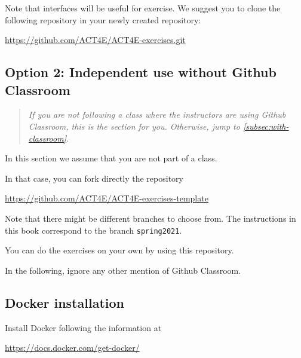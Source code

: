 Note that interfaces will be useful for exercise. We suggest you to clone the following repository in your newly created  repository:

\url{https://github.com/ACT4E/ACT4E-exercises.git}

\subsection{Option 2: Independent use without Github Classroom}
\label{sub:without-classroom}

\begin{quote}
  \emph{
    If you are \emph{not} following a class where the instructors are using Github Classroom,
    this is the section for you. Otherwise, jump to \cref{subsec:with-classroom}.
  }
\end{quote}

In this section we assume that you are not part of a class.

In that case, you can fork directly the repository

\url{https://github.com/ACT4E/ACT4E-exercises-template}

Note that there might be different branches to choose from. The instructions in this book correspond to
the branch \texttt{spring2021}.

You can do the exercises on your own by using this repository.

In the following, ignore any other mention of Github Classroom.

\subsection{Docker installation}

Install Docker following the information at

\url{https://docs.docker.com/get-docker/}

